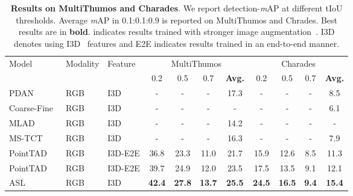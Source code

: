 \documentclass[10pt,twocolumn,letterpaper]{article}
\begin{document}
\begin{table*}[ht]
 \centering 
 \small
 \caption{\label{tab:mthumosandcharades} \textbf{Results on MultiThumos and Charades}. We report detection-\textit{m}AP at different tIoU thresholds. Average \textit{m}AP in 0.1:0.1:0.9 is reported on MultiThumos and Chrades. Best results are in \textbf{bold}.  indicates results trained with stronger image augmentation~\cite{tanpointtad, tadtr}. I3D denotes using I3D~\cite{i3d} features and E2E indicates results trained in an end-to-end manner.}
 \vspace{0.5em}
 {
  \begin{tabular}{l|l|l|cccc|cccc} 
  \toprule
  \multirow{2}{*}{Model} & \multirow{2}{*}{Modality} & \multirow{2}{*}{Feature} & \multicolumn{4}{c}{MultiThumos} & \multicolumn{4}{c}{Charades}\tabularnewline
 & & & 0.2 & 0.5 & 0.7 & \textbf{Avg.} & 0.2 & 0.5 & 0.7 & \textbf{Avg.} \\

    \hline
    PDAN~\cite{dai2021pdan} & RGB & I3D & - & - & - & 17.3  & - & - & - & 8.5  \tabularnewline
    Coarse-Fine~\cite{kahatapitiya2021coarsefine} & RGB & I3D & - & - & -& - & - & - & - & 6.1  \tabularnewline
    MLAD~\cite{mlad} & RGB & I3D & - & - & - & 14.2  & - & - & - & - \tabularnewline
    MS-TCT~\cite{dai2022mstct} & RGB & I3D & - & - & - & 16.3  & - & - & - & 7.9   \tabularnewline
    PointTAD~\cite{tanpointtad} & RGB & I3D-E2E & 36.8 & 23.3 & 11.0 & 21.7 & 15.9 & 12.6 & 8.5 & 11.3 \tabularnewline
    PointTAD~\cite{tanpointtad} & RGB & I3D-E2E & 39.7 & 24.9 & 12.0 & 23.5 & 17.5 & 13.5 & 9.1 & 12.1 \tabularnewline
   \hline
    ASL & RGB & I3D & \textbf{42.4} & \textbf{27.8} & \textbf{13.7} & \textbf{25.5} & \textbf{24.5} & \textbf{16.5} & \textbf{9.4} & \textbf{15.4} \tabularnewline  \bottomrule
  \end{tabular}
 }
\end{table*}
\end{document}
